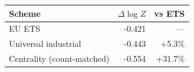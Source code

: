 \begin{tabular}{lrr}
\toprule
Scheme & $\Delta\log Z$ & vs ETS \\
\midrule
EU ETS & -0.421 & --- \\
Universal industrial & -0.443 & +5.3\% \\
Centrality (count-matched) & -0.554 & +31.7\% \\
\bottomrule
\end{tabular}
